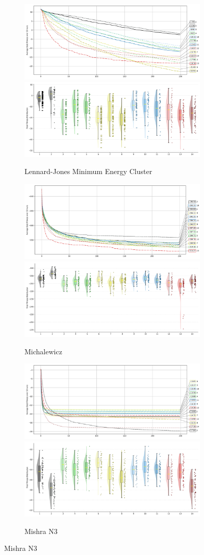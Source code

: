 \begin{figure}[p]
\begin{subfigure}{1\textwidth}
    \centering
    \includegraphics[width=.49\textwidth]{Figures/results/1000/Lennard_Jones_Minimum_Energy_Cluster_All_selected_algorithms_dim1000_annot_legend.png}
    \includegraphics[width=.49\textwidth]{Figures/results/1000/Lennard_Jones_Minimum_Energy_Cluster_all_dim1000_raincloud_vertical.png}
    \caption{Lennard-Jones Minimum Energy Cluster}
\end{subfigure}

\begin{subfigure}{1\textwidth}
    \centering
    \includegraphics[width=.49\textwidth]{Figures/results/1000/Michalewicz_All_selected_algorithms_dim1000_annot_legend.png}
    \includegraphics[width=.49\textwidth]{Figures/results/1000/Michalewicz_all_dim1000_raincloud_vertical.png}
    \caption{Michalewicz}
\end{subfigure}

\begin{subfigure}{1\textwidth}
    \centering
    \includegraphics[width=.49\textwidth]{Figures/results/1000/Mishra_N3_All_selected_algorithms_dim1000_annot_legend.png}
    \includegraphics[width=.49\textwidth]{Figures/results/1000/Mishra_N3_all_dim1000_raincloud_vertical.png}
    \caption{Mishra N3}
\end{subfigure}


\end{figure}
